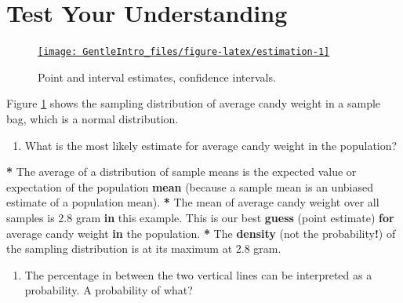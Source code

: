 \documentclass[a4paper]{book}
\newenvironment{Shaded}{\begin{snugshade}}{\end{snugshade}}
\newcommand{\KeywordTok}[1]{\textcolor[rgb]{0,0,0}{\textbf{#1}}}
\newcommand{\FloatTok}[1]{\textcolor[rgb]{0.00,0.00,0.00}{#1}}
\newcommand{\StringTok}[1]{\textcolor[rgb]{0.00,0.00,0.00}{#1}}
\newcommand{\ControlFlowTok}[1]{\textcolor[rgb]{0.00,0.00,0.00}{\textbf{#1}}}
\newcommand{\OperatorTok}[1]{\textcolor[rgb]{0.00,0.00,0.00}{\textbf{#1}}}
\newcommand{\NormalTok}[1]{#1}
\providecommand{\tightlist}{%
  \setlength{\itemsep}{0pt}\setlength{\parskip}{0pt}}
\theoremstyle{definition}
\theoremstyle{definition}
\theoremstyle{definition}
\theoremstyle{remark}
\begin{document}
\section{Test Your Understanding}\label{test-your-understanding-2}

\begin{figure}[H]
\href{http://82.196.4.233:3838/apps/estimation/}{\texttt{[image: GentleIntro\_files/figure-latex/estimation-1]} }\caption{Point and interval estimates, confidence intervals.}\label{fig:estimation}
\end{figure}

Figure \ref{fig:estimation} shows the sampling distribution of average
candy weight in a sample bag, which is a normal distribution.

\begin{enumerate}
\def\labelenumi{\arabic{enumi}.}
\tightlist
\item
  What is the most likely estimate for average candy weight in the
  population?
\end{enumerate}

\begin{Shaded}
\begin{Highlighting}[]
\OperatorTok{*}\StringTok{ }\NormalTok{The average of a distribution of sample means is the expected value or}
\NormalTok{expectation of the population }\KeywordTok{mean}\NormalTok{ (because a sample mean is an unbiased}
\NormalTok{estimate of a population mean).}
\OperatorTok{*}\StringTok{ }\NormalTok{The mean of average candy weight over all samples is }\FloatTok{2.8}\NormalTok{ gram }\ControlFlowTok{in}\NormalTok{ this}
\NormalTok{example. This is our best }\KeywordTok{guess}\NormalTok{ (point estimate) }\ControlFlowTok{for}\NormalTok{ average candy weight }\ControlFlowTok{in}
\NormalTok{the population.}
\OperatorTok{*}\StringTok{ }\NormalTok{The }\KeywordTok{density}\NormalTok{ (not the probability}\OperatorTok{!}\NormalTok{) of the sampling distribution is at its}
\NormalTok{maximum at }\FloatTok{2.8}\NormalTok{ gram.}
\end{Highlighting}
\end{Shaded}

\begin{enumerate}
\def\labelenumi{\arabic{enumi}.}
\setcounter{enumi}{1}
\tightlist
\item
  The percentage in between the two vertical lines can be interpreted as
  a probability. A probability of what?
\end{enumerate}
\end{document}
